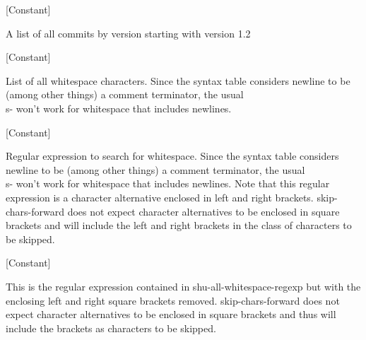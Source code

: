 \vspace{1em}
\noindent
{}
\usebox{\funcname}
 \hfill [Constant]

\begin{doc-string}
A list of all commits by version starting with version 1.2
\end{doc-string}

\vspace{1em}
\noindent
{}
\usebox{\funcname}
 \hfill [Constant]

\begin{doc-string}
List of all whitespace characters.
Since the syntax table considers newline to be (among other things) a
comment terminator, the usual \\s- won't work for whitespace that includes
newlines.
\end{doc-string}

\vspace{1em}
\noindent
{}
\usebox{\funcname}
 \hfill [Constant]

\begin{doc-string}
Regular expression to search for whitespace.  Since the syntax table considers
newline to be (among other things) a comment terminator, the usual \\s- won't work
for whitespace that includes newlines.  Note that this regular expression is a
character alternative enclosed in left and right brackets.  skip-chars-forward does
not expect character alternatives to be enclosed in square brackets and will include
the left and right brackets in the class of characters to be skipped.
\end{doc-string}

\vspace{1em}
\noindent
{}
\usebox{\funcname}
 \hfill [Constant]

\begin{doc-string}
This is the regular expression contained in shu-all-whitespace-regexp but with
the enclosing left and right square brackets removed.  skip-chars-forward does
not expect character alternatives to be enclosed in square brackets and thus
will include the brackets as characters to be skipped.
\end{doc-string}

